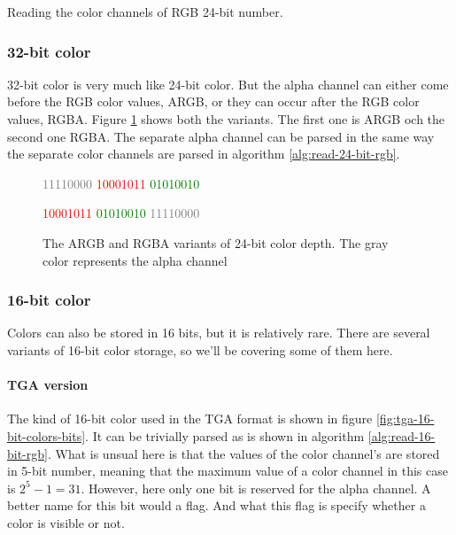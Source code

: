 
\begin{algorithm}[H]
  \caption{Reading the color channels of RGB 24-bit number.}
  \label{alg:read-24-bit-rgb}
  \begin{algorithmic}[1]
  \end{algorithmic}
\end{algorithm}

\subsubsection{32-bit color}

32-bit color is very much like 24-bit color. But the alpha channel
can either come before the RGB color values, ARGB, or
they can occur after the RGB color values, RGBA. Figure
\ref{fig:32-bit-colors-bits} shows both the variants. The first one
is ARGB och the second one RGBA. The separate alpha channel can be
parsed in the same way the separate color channels are parsed in
algorithm \ref{alg:read-24-bit-rgb}.

\begin{figure}
  \centering
  {\Large%
    \textcolor{gray}{11110000}%
    \textcolor{red}{10001011}%
    \textcolor{green}{01010010}%
    \textcolor{blue}{\fullbyte}

    \textcolor{red}{10001011}%
    \textcolor{green}{01010010}%
    \textcolor{blue}{\fullbyte}%
    \textcolor{gray}{11110000}%
  }

  \caption{The ARGB and RGBA variants of 24-bit color depth. The
    gray color represents the alpha channel }
  \label{fig:32-bit-colors-bits}
\end{figure}

\subsubsection{16-bit color}

Colors can also be stored in 16 bits, but it is relatively
rare. There are several variants of 16-bit color storage, so we'll
be covering some of them here.

\paragraph{TGA version}

The kind of 16-bit color used in the TGA format is shown in figure
\ref{fig:tga-16-bit-colors-bits}. It can be trivially parsed as is
shown in algorithm \ref{alg:read-16-bit-rgb}. What is unsual here is
that the values of the color channel's are stored in 5-bit number,
meaning that the maximum value of a color channel in this case is
$2^5 - 1 = 31$. However, here only one bit is reserved for the alpha
channel. A better name for this bit would a flag. And what this flag
is specify whether a color is visible or not.

